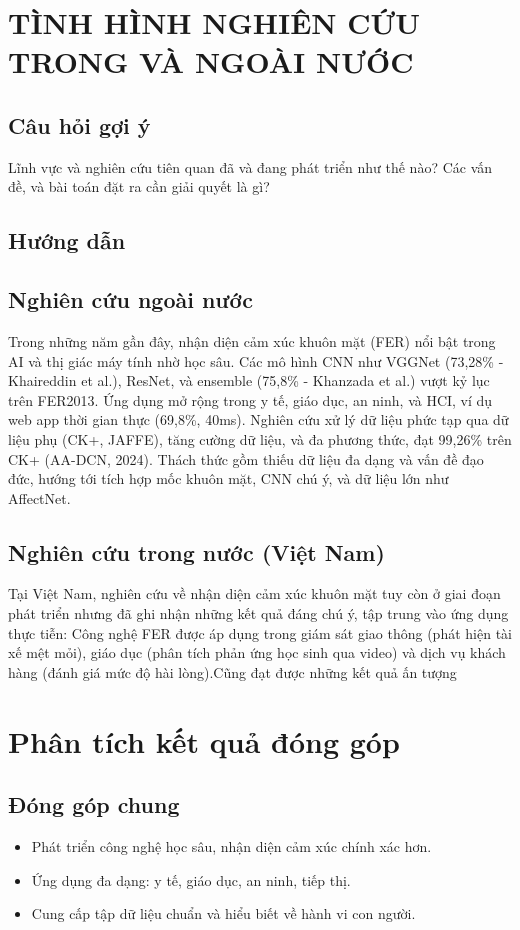 \section*{TÌNH HÌNH NGHIÊN CỨU TRONG VÀ NGOÀI NƯỚC}
\subsection*{Câu hỏi gợi ý}
Lĩnh vực và nghiên cứu tiên quan đã và đang phát triển như thế nào? Các vấn đề, và bài toán đặt ra cần giải quyết là gì?
\subsection*{Hướng dẫn}
\subsection*{Nghiên cứu ngoài nước}
Trong những năm gần đây, nhận diện cảm xúc khuôn mặt (FER) nổi bật trong AI và thị giác máy tính nhờ học sâu. Các mô hình CNN như VGGNet (73,28\% - Khaireddin et al.), ResNet, và ensemble (75,8\% - Khanzada et al.) vượt kỷ lục trên FER2013. Ứng dụng mở rộng trong y tế, giáo dục, an ninh, và HCI, ví dụ web app thời gian thực (69,8\%, 40ms). Nghiên cứu xử lý dữ liệu phức tạp qua dữ liệu phụ (CK+, JAFFE), tăng cường dữ liệu, và đa phương thức, đạt 99,26\% trên CK+ (AA-DCN, 2024). Thách thức gồm thiếu dữ liệu đa dạng và vấn đề đạo đức, hướng tới tích hợp mốc khuôn mặt, CNN chú ý, và dữ liệu lớn như AffectNet.

\subsection*{Nghiên cứu trong nước (Việt Nam)}
Tại Việt Nam, nghiên cứu về nhận diện cảm xúc khuôn mặt tuy còn ở giai đoạn phát triển nhưng đã ghi nhận những kết quả đáng chú ý, tập trung vào ứng dụng thực tiễn: Công nghệ FER được áp dụng trong giám sát giao thông (phát hiện tài xế mệt mỏi), giáo dục (phân tích phản ứng học sinh qua video) và dịch vụ khách hàng (đánh giá mức độ hài lòng).Cũng đạt được những kết quả ấn tượng 
\section*{Phân tích kết quả đóng góp}

\subsection*{Đóng góp chung}
\begin{itemize}
    \item Phát triển công nghệ học sâu, nhận diện cảm xúc chính xác hơn.
    \item Ứng dụng đa dạng: y tế, giáo dục, an ninh, tiếp thị.
    \item Cung cấp tập dữ liệu chuẩn và hiểu biết về hành vi con người.
\end{itemize}

